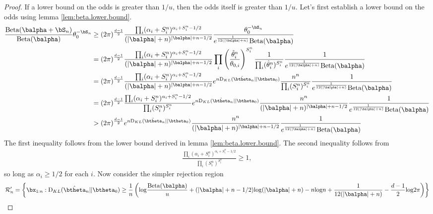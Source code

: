 \documentclass[11pt]{article}
\def\log{{\rm log}}
\newcommand{\Beta}{\mathrm{Beta}}
\newcommand{\KL}{\mathrm{D}_{KL}}
\begin{document}
\begin{proof}
If a lower bound on the odds is greater than $1/u$, then the odds itself is greater than $1/u$. Let's first
establish a lower bound on the odds using lemma \ref{lem:beta.lower.bound}.
\begin{align*}
    \frac{\Beta(\balpha + \bS_n)}
  {\Beta(\balpha)} \theta_0^{-\bS_n}
  &\geq
  (2\pi)^{\frac{d-1}{2}}
    \frac{ \prod_i (\alpha_i+S_i^n)^{\alpha_i + S_i^n-1/2}}
    {(|\balpha|+n)^{|\balpha| + n - 1/2}}
    \frac{ \theta_0^{-\bS_n}}{e^{\frac{1}{12(|\balpha|+n)}}\Beta(\balpha)}\\
  &=
  (2\pi)^{\frac{d-1}{2}}
    \frac{ \prod_i (\alpha_i+S_i^n)^{\alpha_i + S_i^n-1/2}}
    {(|\balpha|+n)^{|\balpha| + n - 1/2}}
    \prod_i \left( \frac{\hat{\theta}^n_i}{\theta_{0,i}} \right)^{S^n_i}
    \frac{1}{\prod_i (\hat{\theta}^n_i)^{S^{n}_{i}}}
    \frac{ 1}{e^{\frac{1}{12(|\balpha|+n)}}\Beta(\balpha)}\\
  &=
  (2\pi)^{\frac{d-1}{2}}
    \frac{ \prod_i (\alpha_i+S_i^n)^{\alpha_i + S_i^n-1/2}}
    {(|\balpha|+n)^{|\balpha| + n - 1/2}}
    e^{n \KL(\hat\btheta_n|| \btheta_0)}
    \frac{n^{n}}{\prod_i (S^n_i)^{S^{n}_{i}}}
    \frac{ 1}{e^{\frac{1}{12(|\balpha|+n)}}\Beta(\balpha)}\\
  &=
  (2\pi)^{\frac{d-1}{2}}
    \frac{ \prod_i (\alpha_i+S_i^n)^{\alpha_i + S_i^n-1/2}}
    {\prod_i (S^n_i)^{S^{n}_{i}}}
    e^{n \KL(\hat\btheta_n|| \btheta_0)}
    \frac{n^{n}}{(|\balpha|+n)^{|\balpha| + n - 1/2}}
    \frac{ 1}{e^{\frac{1}{12(|\balpha|+n)}}\Beta(\balpha)}\\
  &>
  (2\pi)^{\frac{d-1}{2}}
    e^{n \KL(\hat\btheta_n|| \btheta_0)}
    \frac{n^{n}}{(|\balpha|+n)^{|\balpha| + n - 1/2}}
    \frac{ 1}{e^{\frac{1}{12(|\balpha|+n)}}\Beta(\balpha)}\\
\end{align*}
The first inequality follows from the lower bound derived in lemma \ref{lem:beta.lower.bound}.
The second inequality follows from
\begin{align*}
  \frac{ \prod_i (\alpha_i+S_i^n)^{\alpha_i + S_i^n-1/2}}
  {\prod_i (S^n_i)^{S^{n}_{i}}} \geq 1,
\end{align*}
so long as $\alpha_i \geq 1/2$ for each $i$.
Now consider the simpler rejection region
\begin{align*}
  \mathcal{R}_n' &= \left\{ \bx_{1:n} : 
  \KL(\hat\btheta_n|| \btheta_0) \geq \frac{1}{n}\left( \log \frac{\Beta(\balpha)}{u} +(|\balpha|+n-1/2)\log(|\balpha|+n)-n\log n + \frac{1}{12(|\balpha|+n)} - \frac{d-1}{2}\log 2\pi\right)\right\}\\

\end{align*}
\end{proof}
\end{document}
